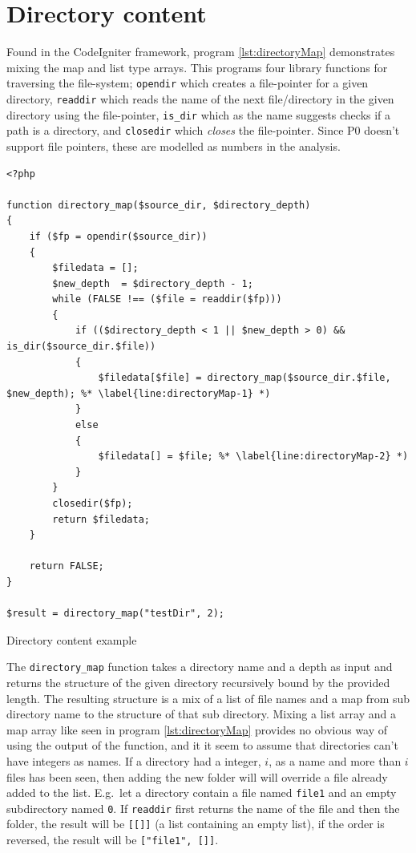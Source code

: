 \section{Directory content}
\label{sec:directoryContent}
Found in the CodeIgniter framework, program \ref{lst:directoryMap} demonstrates mixing the map and list type arrays. This programs four library functions for traversing the file-system; \texttt{opendir} which creates a file-pointer for a given directory, \texttt{readdir} which reads the name of the next file/directory in the given directory using the file-pointer, \texttt{is\_dir} which as the name suggests checks if a path is a directory, and \texttt{closedir} which \emph{closes} the file-pointer. Since P0 doesn't support file pointers, these are modelled as numbers in the analysis. 


\begin{program}
\begin{lstlisting}
<?php

function directory_map($source_dir, $directory_depth)
{
    if ($fp = opendir($source_dir))
    {
        $filedata = [];
        $new_depth	= $directory_depth - 1;
        while (FALSE !== ($file = readdir($fp)))
        {
            if (($directory_depth < 1 || $new_depth > 0) && is_dir($source_dir.$file))
            {
                $filedata[$file] = directory_map($source_dir.$file, $new_depth); %* \label{line:directoryMap-1} *)
            }
            else
            {
                $filedata[] = $file; %* \label{line:directoryMap-2} *)
            }
        }
        closedir($fp);
        return $filedata;
    }

    return FALSE;
}

$result = directory_map("testDir", 2);
\end{lstlisting}
\caption{Directory content example}
\label{lst:directoryMap}
\end{program}


The \texttt{directory\_map} function takes a directory name and a depth as input and returns the structure of the given directory recursively bound by the provided length. The resulting structure is a mix of a list of file names and a map from sub directory name to the structure of that sub directory. Mixing a list array and a map array like seen in program \ref{lst:directoryMap} provides no obvious way of using the output of the function, and it it seem to assume that directories can't have integers as names. If a directory had a integer, $i$, as a name and more than $i$ files has been seen, then adding the new folder will will override a file already added to the list. E.g.\ let a directory contain a file named \texttt{file1} and an empty subdirectory named \texttt{0}. If \texttt{readdir} first returns the name of the file and then the folder, the result will be \texttt{[[]]} (a list containing an empty list), if the order is reversed, the result will be \texttt{["file1", []]}.

